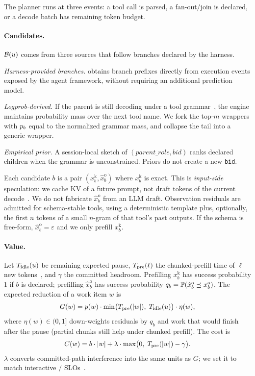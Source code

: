 The planner runs at three events: a tool call is parsed, a fan-out/join is declared, or a decode batch has remaining token budget.

\paragraph{Candidates.}
$\mathcal{B}(u)$ comes from three sources that follow branches declared by the harness.

\smallskip\noindent\textit{Harness-provided branches.}
\sys obtains branch prefixes directly from execution events exposed by the agent framework, without requiring an additional prediction model.

\smallskip\noindent\textit{Logprob-derived.}
If the parent is still decoding under a tool grammar~\cite{sglang,spork}, the engine maintains probability mass over the next tool name.
We fork the top-$m$ wrappers with $p_b$ equal to the normalized grammar mass, and collapse the tail into a generic wrapper.

\smallskip\noindent\textit{Empirical prior.}
A session-local sketch of $(\mathit{parent\_role},\mathit{bid})$ ranks declared children when the grammar is unconstrained.
Priors do not create a new \texttt{bid}.

Each candidate $b$ is a pair $(x^{\mathrm{k}}_b, \hat{x}^{\mathrm{o}}_b)$ where $x^{\mathrm{k}}_b$ is exact.
This is \emph{input-side} speculation: we cache KV of a future prompt, not draft tokens of the current decode~\cite{speculative,medusa,eagledraft}.
We do not fabricate $\hat{x}^{\mathrm{o}}_b$ from an LLM draft.
Observation residuals are admitted for schema-stable tools, using a deterministic template plus, optionally, the first $n$ tokens of a small $n$-gram of that tool's past outputs.
If the schema is free-form, $\hat{x}^{\mathrm{o}}_b=\varepsilon$ and we only prefill $x^{\mathrm{k}}_b$.

\paragraph{Value.}
Let $T_{\mathrm{idle}}(u)$ be remaining expected pause, $T_{\mathrm{pre}}(\ell)$ the chunked-prefill time of $\ell$ new tokens~\cite{sarathi}, and $\gamma$ the committed \tbt{} headroom.
Prefilling $x^{\mathrm{k}}_b$ has success probability $1$ if $b$ is declared; prefilling $\hat{x}^{\mathrm{o}}_b$ has success probability $q_b=\mathbb{P}(\hat{x}^{\mathrm{o}}_b \preceq x^{\mathrm{o}}_b)$.
The expected \ttft{} reduction of a work item $w$ is
\begin{equation}
\label{eq:gain}
G(w) = p(w)\cdot \min\bigl(T_{\mathrm{pre}}(|w|),\; T_{\mathrm{idle}}(u)\bigr)\cdot \eta(w),
\end{equation}
where $\eta(w)\in(0,1]$ down-weights residuals by $q_b$ and work that would finish after the pause (partial chunks still help under chunked prefill).
The cost is
\begin{equation}
\label{eq:cost}
C(w) = b\cdot |w| + \lambda\cdot \max\bigl(0,\; T_{\mathrm{pre}}(|w|)-\gamma\bigr).
\end{equation}
$\lambda$ converts committed-path interference into the same units as $G$; we set it to match interactive \tbt{}/\ttft{} SLOs~\cite{jitserve}.

